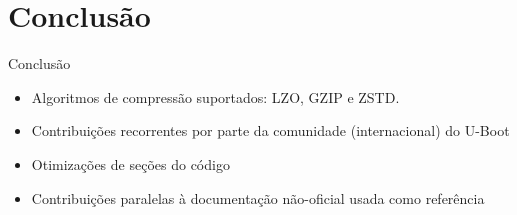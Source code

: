 \section{Conclusão}
\begin{frame}{Conclusão}
	\begin{itemize}
	    \item Algoritmos de compressão suportados: LZO, GZIP e ZSTD.
	    \item Contribuições recorrentes por parte da comunidade (internacional) do U-Boot
	    \item Otimizações de seções do código
	    \item Contribuições paralelas à documentação não-oficial usada como referência
	\end{itemize} 
\end{frame}